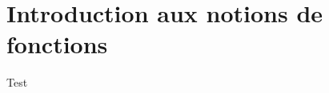 \documentclass[a4paper]{book}
\begin{document}
\setcounter{chapter}{1}
\renewcommand{\monTitre}{Introduction aux notions de fonctions}
\chapter{\monTitre}

    Test
\end{document}

